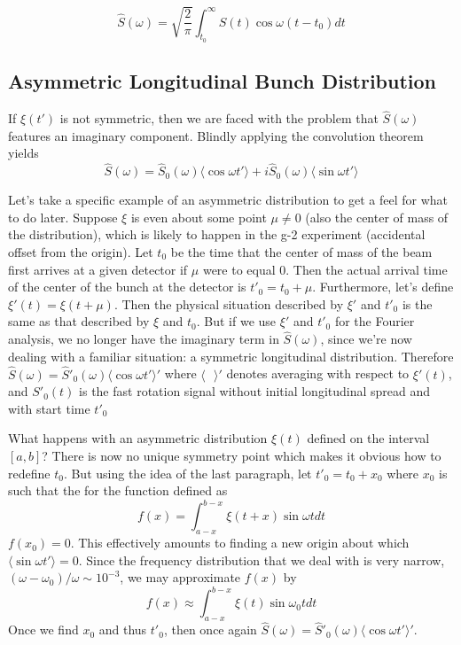 \begin{equation}
\hat{S}(\omega)=\sqrt{\frac{2}{\pi}}\int^{\infty}_{t_0}S(t)\cos\omega(t-t_0)dt
\label{eq:integEvenBunchFT}
\end{equation}

\subsection{Asymmetric Longitudinal Bunch Distribution}

If $\xi(t')$ is not symmetric, then we are faced with the problem that $\hat{S}(\omega)$ features an imaginary component. Blindly applying the convolution theorem yields \[\hat{S}(\omega)=\hat{S}_0(\omega)\langle\cos\omega t'\rangle+i\hat{S}_0(\omega)\langle\sin\omega t'\rangle\]

Let's take a specific example of an asymmetric distribution to get a feel for what to do later. Suppose $\xi$ is even about some point $\mu\neq0$ (also the center of mass of the distribution), which is likely to happen in the g-2 experiment (accidental offset from the origin). Let $t_0$ be the time that the center of mass of the beam first arrives at a given detector if $\mu$ were to equal 0. Then the actual arrival time of the center of the bunch at the detector is $t'_0=t_0+\mu$. Furthermore, let's define $\xi'(t)=\xi(t+\mu)$. Then the physical situation described by $\xi'$ and $t'_0$ is the same as that described by $\xi$ and $t_0$. But if we use $\xi'$ and $t'_0$ for the Fourier analysis, we no longer have the imaginary term in $\hat{S}(\omega)$, since we're now dealing with a familiar situation: a symmetric longitudinal distribution. Therefore $\hat{S}(\omega)=\hat{S}'_0(\omega)\langle\cos\omega t'\rangle'$ where $\langle\text{ }\rangle'$ denotes averaging with respect to $\xi'(t)$, and $S'_0(t)$ is the fast rotation signal without initial longitudinal spread and with start time $t'_0$ 

What happens with an asymmetric distribution $\xi(t)$ defined on the interval $[a,b]$? There is now no unique symmetry point which makes it obvious how to redefine $t_0$. But using the idea of the last paragraph, let $t'_0=t_0+x_0$ where $x_0$ is such that the for the function defined as \[f(x)=\int^{b-x}_{a-x}\xi(t+x)\sin\omega tdt\] $f(x_0)=0$. This effectively amounts to finding a new origin about which $\langle\sin\omega t'\rangle=0$. Since the frequency distribution that we deal with is very narrow, $(\omega-\omega_0)/\omega\sim10^{-3}$, we may approximate $f(x)$ by \[f(x)\approx\int^{b-x}_{a-x}\xi(t)\sin\omega_0 tdt\] Once we find $x_0$ and thus $t'_0$, then once again $\hat{S}(\omega)=\hat{S}'_0(\omega)\langle\cos\omega t'\rangle'$.

